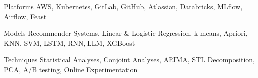 \begin{cvskills}
  \cvskill
    {Platforms} %
    {AWS, Kubernetes, GitLab, GitHub, Atlassian, Databricks, MLflow, Airflow, Feast} %

  \cvskill
    {Models} %
    {Recommender Systems, Linear \& Logistic Regression, k-means, Apriori, KNN, SVM, LSTM, RNN, LLM, XGBoost} %

  \cvskill
    {Techniques} %
    {Statistical Analyses, Conjoint Analyses, ARIMA, STL Decomposition, PCA, A/B testing, Online Experimentation} %


\end{cvskills}
